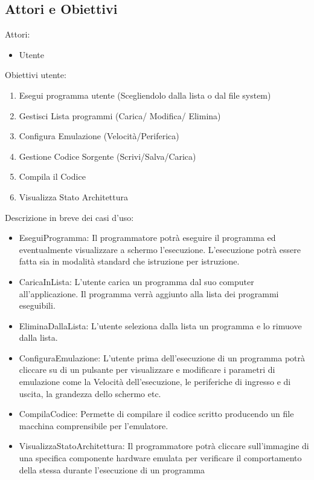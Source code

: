 \documentclass[11pt]{article}
\begin{document}
\subsection{Attori e Obiettivi}
Attori:
\begin{itemize}
	\item{Utente}
\end{itemize}
Obiettivi utente:
\begin{enumerate}
	\item{
		Esegui programma utente (Scegliendolo dalla lista o dal file system)
	}
	\item{
		Gestisci Lista programmi (Carica/ Modifica/ Elimina)
	}
	\item{
		Configura Emulazione (Velocità/Periferica)
	}
	\item{
		Gestione Codice Sorgente (Scrivi/Salva/Carica)
	}
	\item{
		Compila il Codice 
	}
	\item{
		Visualizza Stato Architettura 
	}
\end{enumerate}

Descrizione in breve dei casi d’uso:
\begin{itemize}
\item{
	EseguiProgramma: Il programmatore potrà eseguire il programma ed eventualmente visualizzare a schermo l’esecuzione. L’esecuzione potrà essere fatta sia in modalità standard che istruzione per istruzione.
}
\item{
	CaricaInLista: L’utente carica un programma dal suo computer all’applicazione. Il programma verrà aggiunto alla lista dei programmi eseguibili.
}
\item{
	EliminaDallaLista: L’utente seleziona dalla lista un programma e lo rimuove dalla lista.
}
\item{
	ConfiguraEmulazione: L’utente prima dell’esecuzione di un programma potrà cliccare su di un pulsante per visualizzare e modificare i parametri di emulazione come la Velocità dell’esecuzione, le periferiche di ingresso e di uscita, la grandezza dello schermo etc. 
}
\item{
	CompilaCodice: Permette di compilare il codice scritto producendo un file macchina comprensibile per l’emulatore.
}
\item{
	VisualizzaStatoArchitettura: Il programmatore potrà cliccare sull’immagine di una specifica componente hardware emulata per verificare il comportamento della stessa durante l’esecuzione di un programma
}
\end{itemize}
\end{document}
